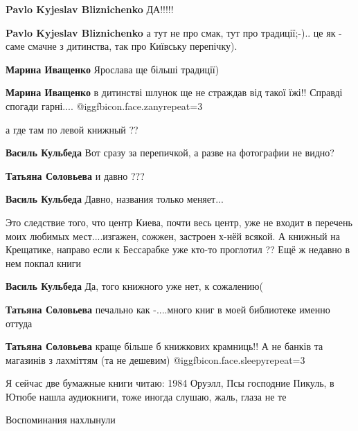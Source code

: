 \begin{itemize}
\begin{itemize}
\textbf{Pavlo Kyjeslav Bliznichenko} ДА!!!!!

\textbf{Pavlo Kyjeslav Bliznichenko} а тут не про смак, тут про традиції;-).. це як - саме смачне з дитинства, так про Київську перепічку).

\textbf{Марина Иващенко} Ярослава ще більші традиції)

\textbf{Марина Иващенко} в дитинстві шлунок ще не страждав від такої їжі!! Справді спогади гарні.... @igg{fbicon.face.zany}{repeat=3} 
\end{itemize} %

а где там по левой книжный ??

\begin{itemize} %
\textbf{Василь Кульбеда} Вот сразу за перепичкой, а разве на фотографии не видно?

\textbf{Татьяна Соловьева} и давно ???

\textbf{Василь Кульбеда} Давно, названия только меняет...


Это следствие того, что центр Киева, почти весь центр, уже не входит в
перечень моих любимых мест....изгажен, сожжен, застроен х-нёй всякой. А
книжный на Крещатике, направо если к Бессарабке уже кто-то проглотил ?? Ещё ж
недавно в нем покпал книги

\begin{itemize} %
\textbf{Василь Кульбеда} Да, того книжного уже нет, к сожалению(

\textbf{Татьяна Соловьева} печально как -....много книг в моей библиотеке именно оттуда

\textbf{Татьяна Соловьева} краще більше б книжкових крамниць!! А не банків та магазинів з лахміттям (та не дешевим) @igg{fbicon.face.sleepy}{repeat=3} 
\end{itemize} %

\end{itemize} %


Я сейчас две бумажные книги читаю: 1984 Оруэлл, Псы господние Пикуль, в Ютюбе
нашла аудиокниги, тоже иногда слушаю, жаль, глаза не те

Воспоминания нахлынули


\end{itemize}
